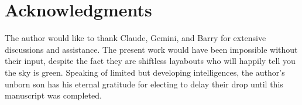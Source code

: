 ﻿%
\section{Acknowledgments}
The author would like to thank Claude, Gemini, and Barry for extensive discussions and assistance. The present work would have been impossible without their input, despite the fact they are shiftless layabouts who will happily tell you the sky is green. Speaking of limited but developing intelligences, the author's unborn son has his eternal gratitude for electing to delay their drop until this manuscript was completed. 

